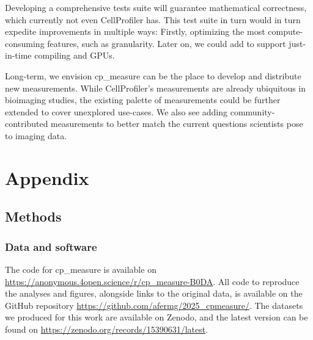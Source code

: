 \documentclass{article}
\begin{document}
Developing a comprehensive tests suite will guarantee mathematical correctness, which currently not even CellProfiler has. This test suite in turn would in turn expedite improvements in multiple ways: Firstly, optimizing the most compute-consuming features, such as granularity. Later on, we could add to support just-in-time compiling and GPUs.

Long-term, we envision cp\_measure can be the place to develop and distribute new measurements. While CellProfiler's measurements are already ubiquitous in bioimaging studies, the existing palette of measurements could be further extended to cover unexplored use-cases. We also see adding community-contributed measurements to better match the current questions scientists pose to imaging data.




\section{Appendix}
\label{sec:orgdd18dd8}
\subsection{Methods}
\label{sec:orgb3e9382}
\subsubsection{Data and software}
\label{sec:orgbda0ae2}
The code for cp\_measure is available on \url{https://anonymous.4open.science/r/cp\_measure-B0DA}. All code to reproduce the analyses and figures, alongside links to the original data, is available on the GitHub repository \url{https://github.com/afermg/2025\_cpmeasure/}. The datasets we produced for this work are available on Zenodo, and the latest version can be found on \url{https://zenodo.org/records/15390631/latest}.
\end{document}
